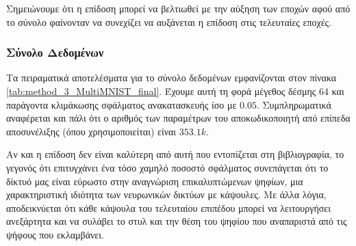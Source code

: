 Σημειώνουμε ότι η επίδοση μπορεί να βελτιωθεί με την αύξηση των εποχών αφού από το σύνολο  φαίνονταν να συνεχίζει να αυξάνεται η επίδοση στις τελευταίες εποχές.

\subsubsection{Σύνολο Δεδομένων }

Τα πειραματικά αποτελέσματα για το σύνολο δεδομένων  εμφανίζονται στον πίνακα \ref{tab:method_3_MultiMNIST_final}. Έχουμε αυτή τη φορά μέγεθος δέσμης 64 και παράγοντα κλιμάκωσης σφάλματος ανακατασκευής ίσο με $0.05$. Συμπληρωματικά αναφέρεται και πάλι ότι ο αριθμός των παραμέτρων του αποκωδικοποιητή από επίπεδα αποσυνέλιξης (όπου χρησιμοποιείται) είναι $353.1k$.

\begin{table}[h]
    \begin{center}
    \end{center}
    \caption[]{\label{tab:method_3_MultiMNIST_final}Επίδωση των αλγορίθμων της μεθόδου 3 στο σύνολο δεδομένων , όταν χρησιμοποιούνται 300 εποχές για την εκπαίδευση του μοντέλου με μέγεθος δέσμης 32.} 
\end{table}

Αν και η επίδοση δεν είναι καλύτερη από αυτή που εντοπίζεται στη βιβλιογραφία, το γεγονός ότι επιτυγχάνει ένα τόσο χαμηλό ποσοστό σφάλματος συνεπάγεται ότι το δίκτυό μας είναι εύρωστο στην αναγνώριση επικαλυπτώμενων ψηφίων, μια χαρακτηριστική ιδιότητα των νευρωνικών δικτύων με κάψουλες. Με άλλα λόγια, αποδεικνύεται ότι κάθε κάψουλα του τελευταίου επιπέδου μπορεί να λειτουργήσει ανεξάρτητα και να συλάβει το στυλ και την θέση του ψηφίου που αναπαριστά από τις ψήφους που εκλαμβάνει.

